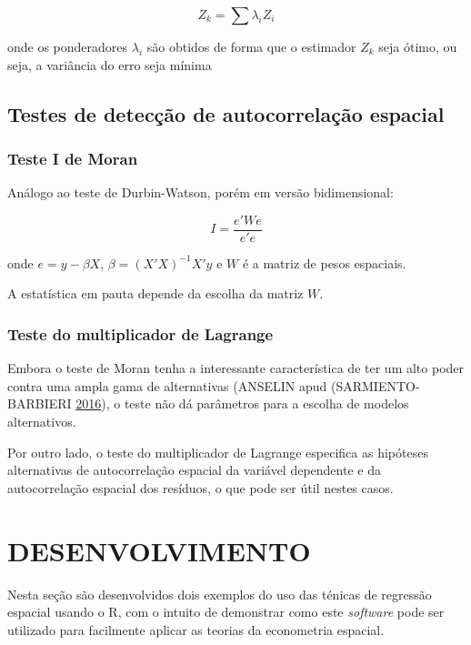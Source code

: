 \documentclass[12pt,]{article}
\begin{document}
\begin{equation}
  \label{eq-krigagem}
  Z_k = \sum{\lambda_i Z_i}
\end{equation}

onde os ponderadores \(\lambda_i\) são obtidos de forma que o estimador
\(Z_k\) seja ótimo, ou seja, a variância do erro seja mínima

\subsection{Testes de detecção de autocorrelação
espacial}\label{testes-de-deteccao-de-autocorrelacao-espacial}

\subsubsection{Teste I de Moran}\label{teste-i-de-moran}

Análogo ao teste de Durbin-Watson, porém em versão bidimensional:

\begin{equation}
  \label{eq-moran}
  I = \frac{e'We}{e'e}
\end{equation}

onde \(e = y - \beta X\), \(\beta = ({X}'X)^{-1}X'y\) e \(W\) é a matriz
de pesos espaciais.

A estatística em pauta depende da escolha da matriz \(W\).

\subsubsection{Teste do multiplicador de
Lagrange}\label{teste-do-multiplicador-de-lagrange}

Embora o teste de Moran tenha a interessante característica de ter um
alto poder contra uma ampla gama de alternativas (ANSELIN apud
(SARMIENTO-BARBIERI \protect\hyperlink{ref-sarmiento-barbieri}{2016}), o
teste não dá parâmetros para a escolha de modelos alternativos.

Por outro lado, o teste do multiplicador de Lagrange especifica as
hipóteses alternativas de autocorrelação espacial da variável dependente
e da autocorrelação espacial dos resíduos, o que pode ser útil nestes
casos.

\section{DESENVOLVIMENTO}\label{desenvolvimento}

Nesta seção são desenvolvidos dois exemplos do uso das ténicas de
regressão espacial usando o R, com o intuito de demonstrar como este
\emph{software} pode ser utilizado para facilmente aplicar as teorias da
econometria espacial.
\end{document}
